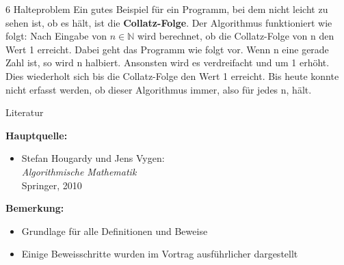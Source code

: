 \documentclass{beamer}
\newcommand{\N}{\mathbb{N}}%
\begin{document}
\begin{frame}{6 Halteproblem}
Ein gutes Beispiel für ein Programm, bei dem nicht leicht zu sehen ist, ob es hält, ist die \textbf{Collatz-Folge}. Der Algorithmus funktioniert wie folgt:
Nach Eingabe von \(n \in \N \) wird berechnet, ob die Collatz-Folge von n den Wert 1 erreicht. Dabei geht das Programm wie folgt vor. Wenn n eine gerade Zahl ist, so wird n halbiert. Ansonsten wird es verdreifacht und um 1 erhöht. Dies wiederholt sich bis die Collatz-Folge den Wert 1 erreicht. Bis heute konnte nicht erfasst werden, ob dieser Algorithmus immer, also für jedes n, hält.

\end{frame}

\begin{frame}{Literatur}

\textbf{Hauptquelle:}

\begin{itemize}
    \item Stefan Hougardy und Jens Vygen: \\
    \textit{Algorithmische Mathematik} \\
    Springer, 2010
\end{itemize}

\vspace{1em}

\textbf{Bemerkung:}
\begin{itemize}
    \item Grundlage für alle Definitionen und Beweise
    \item Einige Beweisschritte wurden im Vortrag ausführlicher dargestellt
\end{itemize}

\end{frame}
\end{document}
